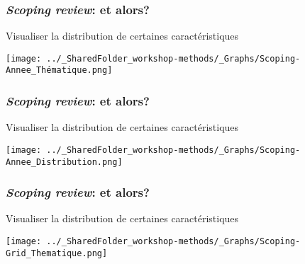 \documentclass{beamer}
\begin{document}

    \begin{frame}
    
      \frametitle{\emph{Scoping review}: et \R alors?} \vspace{1cm}
      
      Visualiser la distribution de certaines caractéristiques
      
        \begin{center}
         \texttt{[image: ../\_SharedFolder\_workshop-methods/\_Graphs/Scoping-Annee\_Thématique.png]}
        \end{center} 
      
          
    \end{frame}  
    

    \begin{frame}
    
      \frametitle{\emph{Scoping review}: et \R alors?} \vspace{1cm}
      
      Visualiser la distribution de certaines caractéristiques
      
     \begin{center}
         \texttt{[image: ../\_SharedFolder\_workshop-methods/\_Graphs/Scoping-Annee\_Distribution.png]}
        \end{center} 
      
          
    \end{frame}  
    
    

    \begin{frame}
    
      \frametitle{\emph{Scoping review}: et \R alors?} \vspace{1cm}
      
      Visualiser la distribution de certaines caractéristiques
      
     \begin{center}
         \texttt{[image: ../\_SharedFolder\_workshop-methods/\_Graphs/Scoping-Grid\_Thematique.png]}
        \end{center} 
      
          
    \end{frame} 
    
\end{document}
